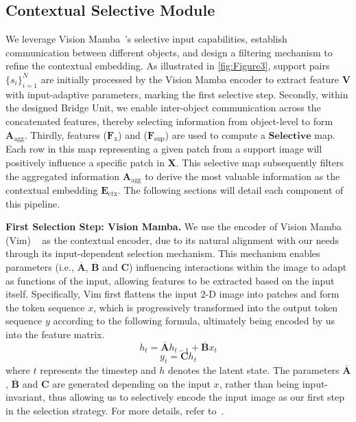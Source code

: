 \subsection{Contextual Selective Module}
\label{sec:Selective}
We leverage Vision Mamba~\cite{zhu2024vision}’s selective input capabilities, establish communication between different objects, and design a filtering mechanism to refine the contextual embedding. As illustrated in \cref{fig:Figure3}, support pairs \(\{ {s}_i \}_{i=1}^N\) are initially processed by the Vision Mamba encoder to extract feature \(\mathbf{V}\) with input-adaptive parameters, marking the first selective step. Secondly, within the designed Bridge Unit, we enable inter-object communication across the concatenated features, thereby selecting information from object-level to form \(\mathbf{A}_{\text{agg}}\). Thirdly, features (\(\mathbf{F}_{\text{x}}\)) and (\(\mathbf{F}_{\text{sup}}\)) are used to compute a \(\mathbf{Selective}\) map. Each row in this map representing a given patch from a support image will positively influence a specific patch in \( \mathbf{X} \). This selective map subsequently filters the aggregated information \(\mathbf{A}_{\text{agg}}\) to derive the most valuable information as the contextual embedding \(\mathbf{E}_{\text{ctx}}\). The following sections will detail each component of this pipeline.

{\bf First Selection Step: Vision Mamba.} We use the encoder of Vision Mamba (Vim) ~\cite{zhu2024vision} as the contextual encoder, due to its natural alignment with our needs through its input-dependent selection mechanism. This mechanism enables parameters (i.e., \( \mathbf{\overline{A}} \), \( \mathbf{\overline{B}} \) and \(\mathbf{C}\))  influencing interactions within the image to adapt as functions of the input, allowing features to be extracted based on the input itself. Specifically, Vim first flattens the input 2-D image into patches and form the token sequence \( x \), which is progressively transformed into the output token sequence \( y \) according to the following formula, ultimately being encoded by us into the feature matrix.
\begin{equation}
  h_{t} = \mathbf{\overline{A}}h_{t-1} + \mathbf{\overline{B}}x_{t}
\end{equation}
\begin{equation}
  y_{t} = \mathbf{C}h_{t}
\end{equation}
where \( t \) represents the timestep and \( h \) denotes the latent state. The parameters \( \mathbf{\overline{A}} \), \( \mathbf{\overline{B}} \) and \(\mathbf{C}\) are generated depending on the input \( x \), rather than being input-invariant, thus allowing us to selectively encode the input image as our first step in the selection strategy. For more details, refer to~\cite{zhu2024vision}.

